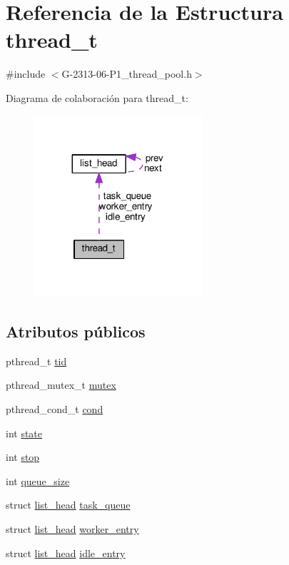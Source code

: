 \hypertarget{structthread__t}{}\section{Referencia de la Estructura thread\+\_\+t}
\label{structthread__t}


{\ttfamily \#include $<$G-\/2313-\/06-\/\+P1\+\_\+thread\+\_\+pool.\+h$>$}



Diagrama de colaboración para thread\+\_\+t\+:\nopagebreak
\begin{figure}[H]
\begin{center}
\leavevmode
\includegraphics[width=176pt]{structthread__t__coll__graph}
\end{center}
\end{figure}
\subsection*{Atributos públicos}
\begin{DoxyCompactItemize}
\item 
pthread\+\_\+t \hyperlink{structthread__t_a92c076d58ca307499452b8dfe0c4e598}{tid}
\item 
pthread\+\_\+mutex\+\_\+t \hyperlink{structthread__t_abb0dcb82ff12b61776b74c76fa27c964}{mutex}
\item 
pthread\+\_\+cond\+\_\+t \hyperlink{structthread__t_a6cb846b84c59d01a8b3a2693d39a4af1}{cond}
\item 
int \hyperlink{structthread__t_a3e0780f1c2fc9932258a60b5043fe424}{state}
\item 
int \hyperlink{structthread__t_a8e9f0fd028676d0ebeef8438f2176bb7}{stop}
\item 
int \hyperlink{structthread__t_aa99eeab6834595bdff5a7da08314fd89}{queue\+\_\+size}
\item 
struct \hyperlink{structlist__head}{list\+\_\+head} \hyperlink{structthread__t_a69c932ede0de60b66a482fb735fca966}{task\+\_\+queue}
\item 
struct \hyperlink{structlist__head}{list\+\_\+head} \hyperlink{structthread__t_a03432229de426c5ba35d0dfa325491f0}{worker\+\_\+entry}
\item 
struct \hyperlink{structlist__head}{list\+\_\+head} \hyperlink{structthread__t_a9386032d478cacdfd680d5691e0eb9d3}{idle\+\_\+entry}
\end{DoxyCompactItemize}


